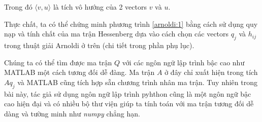 Trong đó $\langle v, u \rangle$ là tích vô hướng của 2 vectors $v$ và $u$.

Thực chất, ta có thể chứng minh phương trình \eqref{arnoldi:1} bằng cách sử dụng quy nạp và tính chất
của ma trận Hessenberg dựa vào cách chọn các vectors $q_j$ và $h_{ij}$ trong thuật giải Arnoldi ở trên 
(chi tiết trong phần phụ lục).


Chúng ta có thể tìm được ma trận $Q$ với các ngôn ngữ lập trình bậc cao như MATLAB một cách 
tương đối dễ đàng. Ma trận $A$ ở đây chỉ xuất hiện trong tích $Aq_j$ và MATLAB cũng tích hợp 
sẵn chương trình nhân ma trận. Tuy nhiên trong bài này, tác giả sử dụng ngôn ngữ lập trình pyhthon 
cũng là một ngôn ngữ bậc cao hiện đại và có nhiều bộ thư viện giúp ta tính toán với ma trận tương 
đối dễ dàng và tường minh như \textit{numpy} chẳng hạn.
